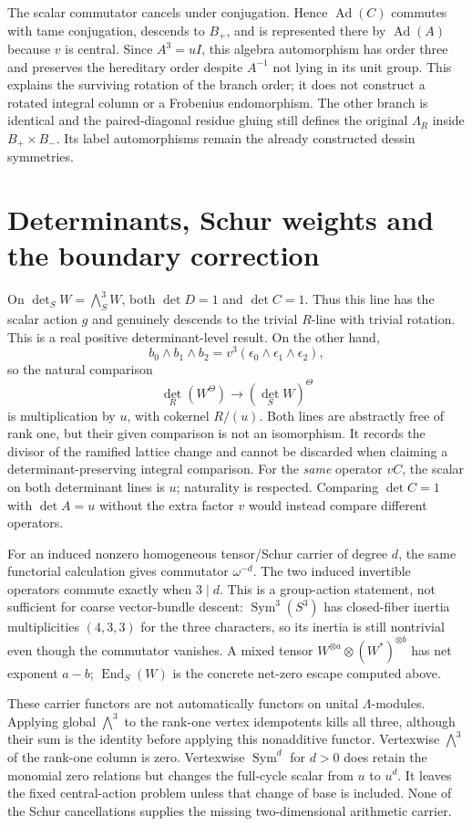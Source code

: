 The scalar commutator cancels under conjugation. Hence $\operatorname{Ad}(C)$ commutes with tame conjugation, descends to $B_+$, and is represented there by $\operatorname{Ad}(A)$ because $v$ is central. Since $A^3=uI$, this algebra automorphism has order three and preserves the hereditary order despite $A^{-1}$ not lying in its unit group. This explains the surviving rotation of the branch order; it does not construct a rotated integral column or a Frobenius endomorphism. The other branch is identical and the paired-diagonal residue gluing still defines the original $\Lambda_R$ inside $B_+\times B_-$. Its label automorphisms remain the already constructed dessin symmetries.

\section{Determinants, Schur weights and the boundary correction}
On $\det_S W=\bigwedge_S^3W$, both $\det D=1$ and $\det C=1$. Thus this line has the scalar action $g$ and genuinely descends to the trivial $R$-line with trivial rotation. This is a real positive determinant-level result. On the other hand,
\[
 b_0\wedge b_1\wedge b_2=v^3(\epsilon_0\wedge\epsilon_1\wedge\epsilon_2),
\]
so the natural comparison
\[
 \det_R(W^\Theta)\longrightarrow(\det_S W)^\Theta
\]
is multiplication by $u$, with cokernel $R/(u)$. Both lines are abstractly free of rank one, but their given comparison is not an isomorphism. It records the divisor of the ramified lattice change and cannot be discarded when claiming a determinant-preserving integral comparison. For the \emph{same} operator $vC$, the scalar on both determinant lines is $u$; naturality is respected. Comparing $\det C=1$ with $\det A=u$ without the extra factor $v$ would instead compare different operators.

For an induced nonzero homogeneous tensor/Schur carrier of degree $d$, the same functorial calculation gives commutator $\omega^{-d}$. The two induced invertible operators commute exactly when $3\mid d$. This is a group-action statement, not sufficient for coarse vector-bundle descent: $\operatorname{Sym}^3(S^3)$ has closed-fiber inertia multiplicities $(4,3,3)$ for the three characters, so its inertia is still nontrivial even though the commutator vanishes. A mixed tensor $W^{\otimes a}\otimes(W^*)^{\otimes b}$ has net exponent $a-b$; $\operatorname{End}_S(W)$ is the concrete net-zero escape computed above.

These carrier functors are not automatically functors on unital $\Lambda$-modules. Applying global $\bigwedge^3$ to the rank-one vertex idempotents kills all three, although their sum is the identity before applying this nonadditive functor. Vertexwise $\bigwedge^3$ of the rank-one column is zero. Vertexwise $\operatorname{Sym}^d$ for $d>0$ does retain the monomial zero relations but changes the full-cycle scalar from $u$ to $u^d$. It leaves the fixed central-action problem unless that change of base is included. None of the Schur cancellations supplies the missing two-dimensional arithmetic carrier.

